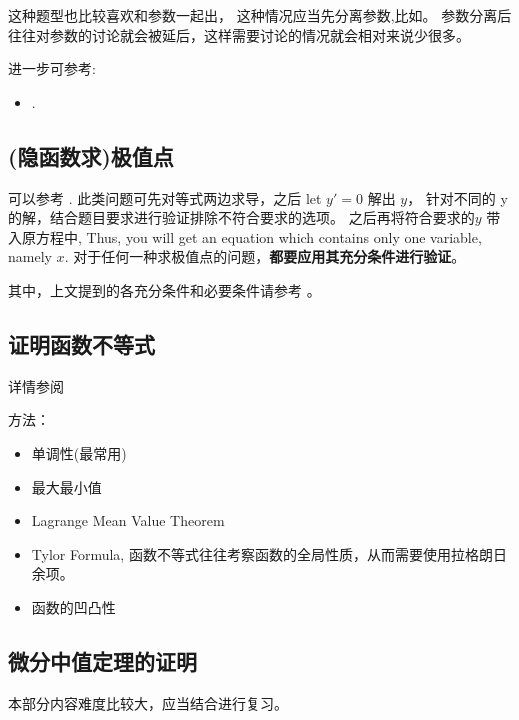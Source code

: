 这种题型也比较喜欢和参数一起出，
这种情况应当先分离参数,比如\cite[page 77, pdf 88, 例5]{we}。
参数分离后往往对参数的讨论就会被延后，这样需要讨论的情况就会相对来说少很多。

进一步可参考:
\begin{itemize}
    \item \cite[page 85, pdf 96, example 6]{we}.
\end{itemize}

\subsection{(隐函数求)极值点}

可以参考 \cite[page 71, pdf 82, 例2]{we}.
此类问题可先对等式两边求导，之后 let $y' = 0$ 解出 $y$，
针对不同的 y 的解，结合题目要求进行验证排除不符合要求的选项。
之后再将符合要求的$y$ 带入原方程中, Thus, you will get an
equation which contains only one variable, namely $x$.
对于任何一种求极值点的问题，\textbf{都要应用其充分条件进行验证}。

其中，上文提到的各充分条件和必要条件请参考
\cite[page 68, pdf 79]{we}。

\subsection{证明函数不等式}

详情参阅 \cite[page 79, pdf 90]{we}

方法：
\begin{itemize}
    \item 单调性(最常用)
    \item 最大最小值
    \item Lagrange Mean Value Theorem
    \item Tylor Formula, 函数不等式往往考察函数的全局性质，从而需要使用拉格朗日余项。
    \item 函数的凹凸性
\end{itemize}

\subsection{微分中值定理的证明}

本部分内容难度比较大，应当结合\cite{we}进行复习。

